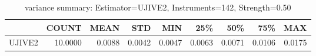 \begin{table}[ht]
\centering
\caption{variance summary: Estimator=UJIVE2, Instruments=142, Strength=0.50}
\begin{tabular}{lrrrrrrrr}
\toprule
 & COUNT & MEAN & STD & MIN & 25\% & 50\% & 75\% & MAX \\
\midrule
UJIVE2 & 10.0000 & 0.0088 & 0.0042 & 0.0047 & 0.0063 & 0.0071 & 0.0106 & 0.0175 \\
\bottomrule
\end{tabular}
\end{table}
